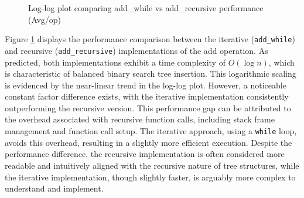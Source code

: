 \documentclass[a4paper,11pt]{article}
\begin{document}
\begin{figure}[h]
    \centering
    \caption{Log-log plot comparing add\_while vs add\_recursive performance (Avg/op)}
    \label{fig:add_operations_comparison}
\end{figure}
Figure \ref{fig:add_operations_comparison} displays the performance comparison between the iterative (\texttt{add\_while}) and recursive (\texttt{add\_recursive}) implementations of the add operation. As predicted, both implementations exhibit a time complexity of $O(\log n)$, which is characteristic of balanced binary search tree insertion. This logarithmic scaling is evidenced by the near-linear trend in the log-log plot. However, a noticeable constant factor difference exists, with the iterative implementation consistently outperforming the recursive version. This performance gap can be attributed to the overhead associated with recursive function calls, including stack frame management and function call setup. The iterative approach, using a \texttt{while} loop, avoids this overhead, resulting in a slightly more efficient execution. Despite the performance difference, the recursive implementation is often considered more readable and intuitively aligned with the recursive nature of tree structures, while the iterative implementation, though slightly faster, is arguably more complex to understand and implement.
\end{document}
